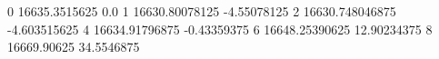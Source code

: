 0 16635.3515625 0.0
1 16630.80078125 -4.55078125
2 16630.748046875 -4.603515625
4 16634.91796875 -0.43359375
6 16648.25390625 12.90234375
8 16669.90625 34.5546875
